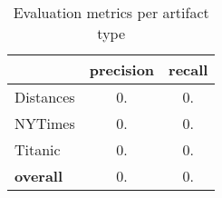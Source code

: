 \begin{table}
\caption{Evaluation metrics per artifact type}
\label{tbl:comparison-overall}
\centering    
\begin{threeparttable}
\begin{tabular}{lcc}

  & \textbf{precision} & \textbf{recall}  \\ 
\hline

Distances & 0. & 0.
\\

NYTimes  & 0. & 0. 
\\

Titanic & 0. & 0.
\\

\hline


\textbf{overall} & 0. & 0.
\\

\hline

\end{tabular}
\end{threeparttable}
\end{table}
